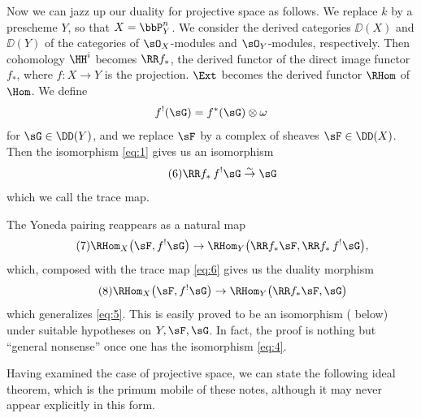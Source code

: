 Now we can jazz up our duality for projective space as follows. We replace $k$ by a prescheme $Y$, so that $X=\bbP_{Y}^{n}$. We consider the derived categories $\DD(X)$ and $\DD(Y)$ of the categories of $\sO_{X}$-modules and $\sO_{Y}$-modules, respectively. Then cohomology $\HH^{i}$ becomes $\RR f_{*}$, the derived functor of the direct image functor $f_{*}$, where $f\colon X\to Y$ is the projection. $\Ext$ becomes the derived functor $\RHom$ of $\Hom$. We define
\[
f^{!}(\sG)=f^{*}(\sG)\otimes\omega
\]
for $\sG\in \DD(Y)$, and we replace $\sF$ by a complex of sheaves $\sF\in \DD(X)$. Then the isomorphism \eqref{eq:1} gives us an isomorphism
\begin{equation}\tag{6}\label{eq:6}
	\RR f_{*}\,f^{!}\sG\stackrel{\sim}{\to}\sG
\end{equation}
which we call the trace map.

The Yoneda pairing reappears as a natural map
\begin{equation}\tag{7}\label{eq:7}
	\RHom_{X}\bigl(\sF,f^{!}\sG\bigr)\to \RHom_{Y}\bigl(\RR f_{*}\sF,\RR f_{*}\,f^{!}\sG\bigr),
\end{equation}
which, composed with the trace map \eqref{eq:6} gives us the duality morphism
\begin{equation}\tag{8}\label{eq:8}
	\RHom_{X}\bigl(\sF,f^{!}\sG\bigr)\to \RHom_{Y}\bigl(\RR f_{*}\sF,\sG\bigr)
\end{equation}
which generalizes \eqref{eq:5}. This is easily proved to be an isomorphism ( below) under suitable hypotheses on $Y,\sF,\sG$. In fact, the proof is nothing but ``general nonsense'' once one has the isomorphism \eqref{eq:4}.

Having examined the case of projective space, we can state the following ideal theorem, which is the primum mobile of these notes, although it may never appear explicitly in this form.

